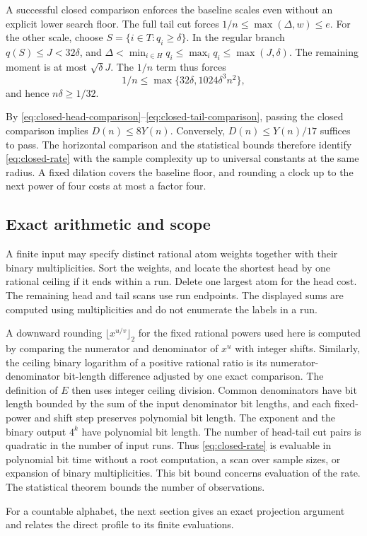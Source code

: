 A successful closed comparison enforces the baseline scales
even without an explicit lower search floor. The full tail cut
forces \(1/n\le\max(\Delta,w)\le e\).
For the other scale, choose \(S=\{i\in T:q_i\ge\delta\}\).
In the regular branch \(q(S)\le J<32\delta\), and
\(\Delta<\min_{i\in H}q_i\le\max_iq_i\le\max(J,\delta)\).
The remaining moment is at most \(\sqrt\delta J\). The \(1/n\)
term thus forces
\[
 1/n\le\max\{32\delta,1024\delta^3n^2\},
\]
and hence \(n\delta\ge1/32\).

By \eqref{eq:closed-head-comparison}--\eqref{eq:closed-tail-comparison},
passing the closed comparison implies \(D(n)\le8Y(n)\).
Conversely, \(D(n)\le Y(n)/17\) suffices to pass. The horizontal
comparison and the statistical bounds therefore identify
\eqref{eq:closed-rate} with the sample complexity up to universal
constants at the same radius. A fixed dilation covers the baseline
floor, and rounding a clock up to the next power of four costs
at most a factor four.

\subsection{Exact arithmetic and scope}

A finite input may specify distinct rational atom weights together
with their binary multiplicities. Sort the weights, and locate the
shortest head by one rational ceiling if it ends within a run.
Delete one largest atom for the head cost. The remaining head
and tail scans use run endpoints. The displayed sums are computed
using multiplicities and do not enumerate the labels in a run.

A downward rounding \(\lfloor x^{u/v}\rfloor_2\) for the fixed
rational powers used here is computed by comparing the numerator and
denominator of \(x^u\) with integer shifts. Similarly, the ceiling binary
logarithm of a positive rational ratio is its numerator-denominator
bit-length difference adjusted by one exact comparison. The
definition of \(E\) then uses integer ceiling division. Common
denominators have bit length bounded by the sum of the input
denominator bit lengths, and each fixed-power and shift step
preserves polynomial bit length. The exponent and the binary
output \(4^k\) have polynomial bit length. The number of head-tail
cut pairs is quadratic in the number of input runs. Thus
\eqref{eq:closed-rate} is evaluable in polynomial bit time without
a root computation, a scan over sample sizes, or expansion of binary
multiplicities. This bit bound concerns evaluation of the rate.
The statistical theorem bounds the number of observations.

For a countable alphabet, the next section gives an exact projection argument
and relates the direct profile to its finite evaluations.
